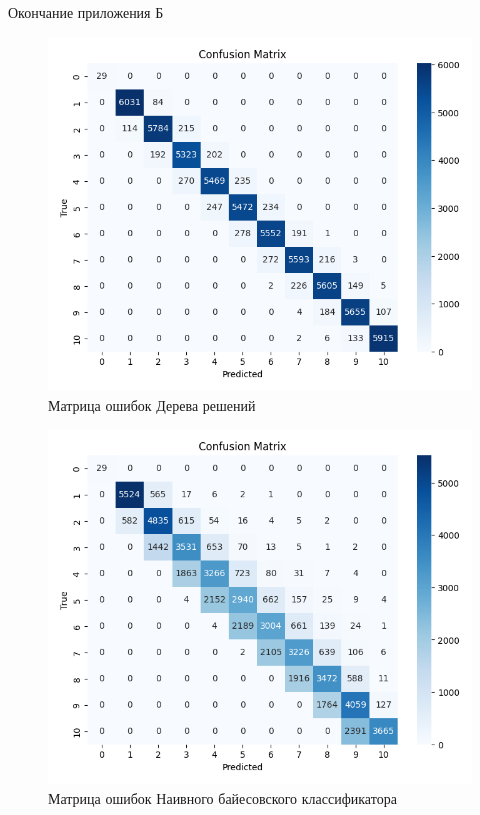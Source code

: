 \newpage
\begin{flushright}
Окончание приложения Б
\end{flushright}
\vspace{-1.5em}

\begin{figure}[H]
    \centering
    \includegraphics[width=0.75\linewidth]{pic/classification/decision_tree.png}
    \vspace{0.5em}\caption{Матрица ошибок Дерева решений}
    \label{ris:tree-class}
\end{figure}
\vspace{1em}

\begin{figure}[H]
    \centering
    \includegraphics[width=0.75\linewidth]{pic/classification/naive_bayes.png}
    \vspace{0.5em}\caption{Матрица ошибок Наивного байесовского классификатора}
    \label{ris:bayes-class}
\end{figure}
\vspace{1em}


